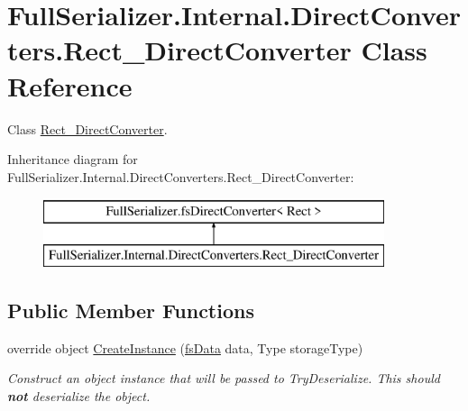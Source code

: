 \hypertarget{class_full_serializer_1_1_internal_1_1_direct_converters_1_1_rect___direct_converter}{}\section{Full\+Serializer.\+Internal.\+Direct\+Converters.\+Rect\+\_\+\+Direct\+Converter Class Reference}
\label{class_full_serializer_1_1_internal_1_1_direct_converters_1_1_rect___direct_converter}


Class \hyperlink{class_full_serializer_1_1_internal_1_1_direct_converters_1_1_rect___direct_converter}{Rect\+\_\+\+Direct\+Converter}.  


Inheritance diagram for Full\+Serializer.\+Internal.\+Direct\+Converters.\+Rect\+\_\+\+Direct\+Converter\+:\begin{figure}[H]
\begin{center}
\leavevmode
\includegraphics[height=2.000000cm]{class_full_serializer_1_1_internal_1_1_direct_converters_1_1_rect___direct_converter}
\end{center}
\end{figure}
\subsection*{Public Member Functions}
\begin{DoxyCompactItemize}
\item 
override object \hyperlink{class_full_serializer_1_1_internal_1_1_direct_converters_1_1_rect___direct_converter_ae48648354077452a90727bbaa8915172}{Create\+Instance} (\hyperlink{class_full_serializer_1_1fs_data}{fs\+Data} data, Type storage\+Type)
\begin{DoxyCompactList}\small\item\em Construct an object instance that will be passed to Try\+Deserialize. This should {\bfseries not} deserialize the object. \end{DoxyCompactList}\end{DoxyCompactItemize}
